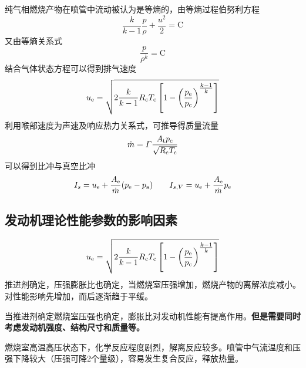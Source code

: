 \sssection[气动关系式及平均等熵指数计算发动机理论性能]

	纯气相燃烧产物在喷管中流动被认为是等熵的，由等熵过程伯努利方程
	\begin{equation}
		\dfrac{k}{k - 1} \dfrac{p}{\rho} + \dfrac{u^2}{2} = \mathrm{C}
	\end{equation}
又由等熵关系式
	\begin{equation}
		\dfrac{p}{\rho^k} = \mathrm{C}
	\end{equation}
结合气体状态方程可以得到排气速度
	\begin{equation}
		u_{\rm{e}} = \sqrt{2 \dfrac{k}{k - 1} R_{\text{c}} T_{\text{c}} \left[1 - \left(\dfrac{p_{\rm{e}}}{p_{\text{c}}}\right)^{\textstyle \frac{k-1}{k}}\right]}
	\end{equation}
利用喉部速度为声速及响应热力关系式，可推导得质量流量
\begin{equation}
	\dot{m} = \varGamma \dfrac{A_{\text{t}} p_{\text{c}}}{\sqrt{R_{\text{c}} T_{\text{c}}}}
\end{equation}
可以得到比冲与真空比冲
\begin{equation}
	I_s = u_{\rm{e}} + \dfrac{A_{\rm{e}}}{\dot{m}}(p_{\rm{e}} - p_{\text{a}}) \qquad I_{s,V} = u_{\rm{e}} + \dfrac{A_{\rm{e}}}{\dot{m}}p_{\rm{e}}
\end{equation}
\vspace*{0.3em}

\subsection{发动机理论性能参数的影响因素}

\sssection[膨胀压强比和燃烧室压强对发动机性能影响]
\begin{equation*}
	u_{\rm{e}} = \sqrt{2 \dfrac{k}{k - 1} R_{\text{c}} T_{\text{c}} \left[1 - \left(\dfrac{p_{\rm{e}}}{p_{\text{c}}}\right)^{\textstyle \frac{k-1}{k}}\right]}
\end{equation*}
	推进剂确定，压强膨胀比也确定，当燃烧室压强增加，燃烧产物的离解浓度减小。对性能影响先增加，而后逐渐趋于平缓。
	
	当推进剂确定燃烧室压强也确定，膨胀比对发动机性能有提高作用。\textbf{但是需要同时考虑发动机强度、结构尺寸和质量等。}
\vspace*{0.8em}


燃烧室高温高压状态下，化学反应程度剧烈，解离反应较多。喷管中气流温度和压强下降较大（压强可降2个量级），容易发生复合反应，释放热量。
\vspace*{0.8em}

